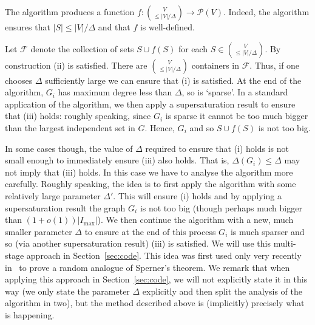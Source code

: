 \documentclass[11pt]{article}
\numberwithin{equation}{section}
\def\COMMENT#1{}
\begin{document}
The algorithm produces a function $f:\binom{V}{\leq |V|/\Delta} \rightarrow \mathcal P(V)$. 
Indeed, the algorithm ensures that $|S|\leq |V|/\Delta$ and that $f$ is  well-defined. 

Let $\mathcal F$ denote the collection of sets $S\cup f(S)$ for each $S \in \binom{V}{\leq |V|/\Delta}$. By construction (ii) is satisfied. There are $\binom{V}{\leq |V|/\Delta}$ containers in $\mathcal F$. Thus, if one chooses $\Delta$ sufficiently large we can ensure that (i) is satisfied. At the end of the algorithm, $G_i$ has maximum degree less than $\Delta$, so is `sparse'. 
In a standard application of the algorithm,
 we then apply a supersaturation result to ensure that (iii) holds: roughly speaking, since $G_i$ is sparse it cannot be too much bigger than the largest independent set in $G$. Hence, $G_i$ and so $S \cup f(S)$ is not too big.

In some cases though, the value of $\Delta$ required to ensure that (i) holds is not small enough to immediately ensure (iii) also holds. That is, $\Delta(G_i)\leq \Delta$ may not imply that (iii) holds.
In this case we have to analyse the algorithm more carefully. Roughly speaking, the idea is to first apply the algorithm with some relatively large parameter $\Delta '$. This will ensure (i) holds and by applying 
a supersaturation result the graph $G_i$ is not too big (though perhaps much bigger than $(1+o(1))|I_{\max}|$). We then continue the algorithm with a new, much smaller parameter $\Delta$ to ensure at the end of this process $G_i$ is much sparser and so (via another supersaturation result) (iii) is satisfied.
We will use this multi-stage approach in Section~\ref{sec:code}. This idea was first used only very recently in~\cite{sper}\COMMENT{AZW: are you sure about this? I assumed that the multi-stage approach was folklore and known for much longer? ----- Yes I asked Jozsi, you were right.} to prove a random analogue of Sperner's theorem.
We remark that when applying this approach in Section~\ref{sec:code}, we will not explicitly state it in this way (we only state the parameter $\Delta$ explicitly and then split the analysis of the algorithm in two), but the method described above is (implicitly) precisely what is happening.
\end{document}
